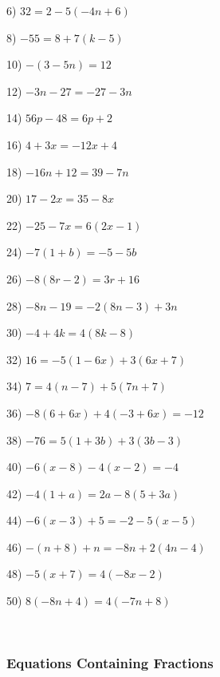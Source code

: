 \begin{multicols}{2}
  6) $32 = 2 - 5 (- 4 n + 6)$
  
  8) $- 55 = 8 + 7 (k - 5)$
  
  10) $- (3 - 5 n) = 12$
  
  12) $- 3 n - 27 = - 27 - 3 n$
  
  14) $56 p - 48 = 6 p + 2$
  
  16) $4 + 3 x = - 12 x + 4$
  
  18) $- 16 n + 12 = 39 - 7 n$
  
  20) $17 - 2 x = 35 - 8 x$
  
  22) $- 25 - 7 x = 6 (2 x - 1)$
  
  24) $- 7 (1 + b) = - 5 - 5 b$
  
  26) $- 8 (8 r - 2) = 3 r + 16$
  
  28) $- 8 n - 19 = - 2 (8 n - 3) + 3 n$
  
  30) $- 4 + 4 k = 4 (8 k - 8)$
  
  32) $16 = - 5 (1 - 6 x) + 3 (6 x + 7)$
  
  34) $7 = 4 (n - 7) + 5 (7 n + 7)$
  
  36) $- 8 (6 + 6 x) + 4 (- 3 + 6 x) = - 12$
  
  38) $- 76 = 5 (1 + 3 b) + 3 (3 b - 3)$
  
  40) $- 6 (x - 8) - 4 (x - 2) = - 4$
  
  42) $- 4 (1 + a) = 2 a - 8 (5 + 3 a) $
  
  44) $- 6 (x - 3) + 5 = - 2 - 5 (x - 5)$
  
  46) $- (n + 8) + n = - 8 n + 2 (4 n - 4)$
  
  48) $- 5 (x + 7) = 4 (- 8 x - 2)$
  
  50) $8 (- 8 n + 4) = 4 (- 7 n + 8)$
\end{multicols}

\vspace{1.5in}
~

\pagebreak

\subsubsection{Equations Containing Fractions}\par

{}

